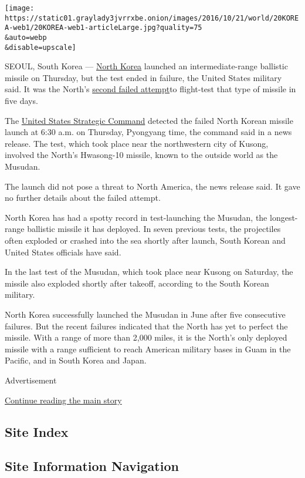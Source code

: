 \texttt{[image: https://static01.graylady3jvrrxbe.onion/images/2016/10/21/world/20KOREA-web1/20KOREA-web1-articleLarge.jpg?quality=75\\\&auto=webp\\\&disable=upscale]}

SEOUL, South Korea ---
\href{http://www.nytimes3xbfgragh.onion/topic/destination/north-korea?8qa}{North
Korea} launched an intermediate-range ballistic missile on Thursday, but
the test ended in failure, the United States military said. It was the
North's
\href{http://www.nytimes3xbfgragh.onion/2016/10/16/world/asia/north-korean-missile-test.html}{second
failed attempt}to flight-test that type of missile in five days.

The \href{https://www.stratcom.mil/}{United States Strategic Command}
detected the failed North Korean missile launch at 6:30 a.m. on
Thursday, Pyongyang time, the command said in a news release. The test,
which took place near the northwestern city of Kusong, involved the
North's Hwasong-10 missile, known to the outside world as the Musudan.

The launch did not pose a threat to North America, the news release
said. It gave no further details about the failed attempt.

North Korea has had a spotty record in test-launching the Musudan, the
longest-range ballistic missile it has deployed. In seven previous
tests, the projectiles often exploded or crashed into the sea shortly
after launch, South Korean and United States officials have said.

In the last test of the Musudan, which took place near Kusong on
Saturday, the missile also exploded shortly after takeoff, according to
the South Korean military.

North Korea successfully launched the Musudan in June after five
consecutive failures. But the recent failures indicated that the North
has yet to perfect the missile. With a range of more than 2,000 miles,
it is the North's only deployed missile with a range sufficient to reach
American military bases in Guam in the Pacific, and in South Korea and
Japan.

Advertisement

\protect\hyperlink{after-bottom}{Continue reading the main story}

\hypertarget{site-index}{%
\subsection{Site Index}\label{site-index}}

\hypertarget{site-information-navigation}{%
\subsection{Site Information
Navigation}\label{site-information-navigation}}

